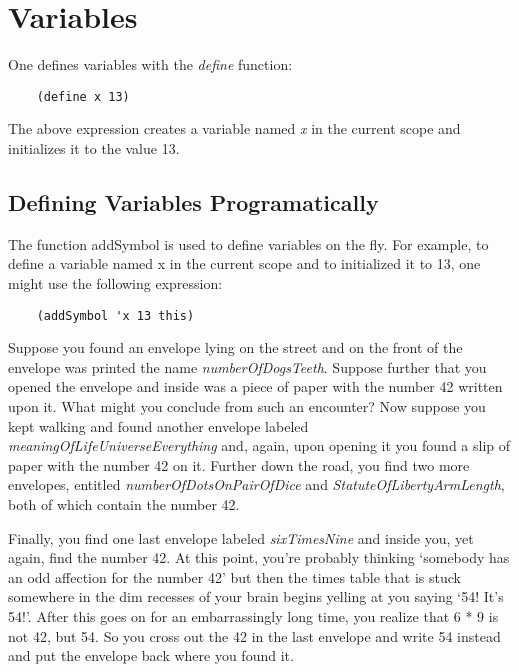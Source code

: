 \chapter{Variables}
\label{Variables}

One defines variables with the {\it define} function:

\begin{verbatim}
    (define x 13)
\end{verbatim}

The above expression creates a variable named {\it x} in the current
scope and initializes it to the value 13.

\section{Defining Variables Programatically}

The function addSymbol is used to define variables on the 
fly. For example, to define a variable named x in the current
scope and to initialized it to 13, one might use the
following expression:

\begin{verbatim}
    (addSymbol 'x 13 this)
\end{verbatim}


Suppose you found an envelope lying on the street and on the front of
the envelope was printed the name {\it numberOfDogsTeeth}.
Suppose further
that you opened the envelope and inside was a piece of paper with
the number 42 written upon it.
What might you conclude from such an
encounter? Now suppose you kept walking and found another envelope
labeled {\it meaningOfLifeUniverseEverything} and,
again, upon opening it
you found a slip of paper with the number 42 on it.
Further down the
road,
you find two more envelopes,
entitled {\it numberOfDotsOnPairOfDice} and
{\it StatuteOfLibertyArmLength},
both of which contain the number 42.

Finally,
you find one last envelope labeled {\it sixTimesNine} and inside you,
yet again,
find the number 42.
At this point,
you're probably thinking `somebody
has an odd affection for the number 42' but then the times table that
is stuck somewhere in the dim recesses of your brain begins yelling at
you saying `54! It's 54!'.
After this goes on for an embarrassingly long
time,
you realize that 6 * 9 is not 42, but 54.
So you cross out the 42
in the last envelope and write 54 instead and put the envelope back
where you found it.

